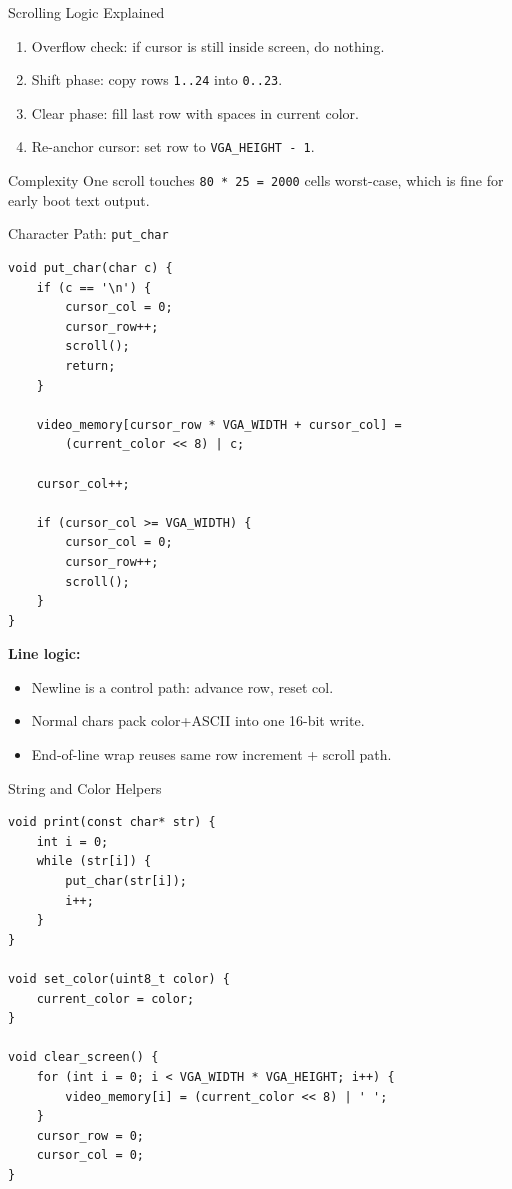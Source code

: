 \documentclass[aspectratio=169]{beamer}
\newcommand{\concept}[2]{%
  \begin{block}{#1}\smallskip #2\smallskip\end{block}\vspace{5pt}}
\begin{document}
\begin{frame}{Scrolling Logic Explained}
  \begin{enumerate}
    \item Overflow check: if cursor is still inside screen, do nothing.
    \item Shift phase: copy rows \texttt{1..24} into \texttt{0..23}.
    \item Clear phase: fill last row with spaces in current color.
    \item Re-anchor cursor: set row to \texttt{VGA\_HEIGHT - 1}.
  \end{enumerate}
  \vspace{6pt}
  \concept{Complexity}{
    One scroll touches \texttt{80 * 25 = 2000} cells worst-case, which is fine for early boot text output.
  }
\end{frame}

\begin{frame}[fragile]{Character Path: \texttt{put\_char}}
  \begin{lstlisting}[style=clang]
void put_char(char c) {
    if (c == '\n') {
        cursor_col = 0;
        cursor_row++;
        scroll();
        return;
    }

    video_memory[cursor_row * VGA_WIDTH + cursor_col] =
        (current_color << 8) | c;

    cursor_col++;

    if (cursor_col >= VGA_WIDTH) {
        cursor_col = 0;
        cursor_row++;
        scroll();
    }
}
  \end{lstlisting}
  \textbf{Line logic:}
  \begin{itemize}
    \item Newline is a control path: advance row, reset col.
    \item Normal chars pack color+ASCII into one 16-bit write.
    \item End-of-line wrap reuses same row increment + scroll path.
  \end{itemize}
\end{frame}

\begin{frame}[fragile]{String and Color Helpers}
  \begin{lstlisting}[style=clang]
void print(const char* str) {
    int i = 0;
    while (str[i]) {
        put_char(str[i]);
        i++;
    }
}

void set_color(uint8_t color) {
    current_color = color;
}

void clear_screen() {
    for (int i = 0; i < VGA_WIDTH * VGA_HEIGHT; i++) {
        video_memory[i] = (current_color << 8) | ' ';
    }
    cursor_row = 0;
    cursor_col = 0;
}
  \end{lstlisting}
\end{frame}
\end{document}
